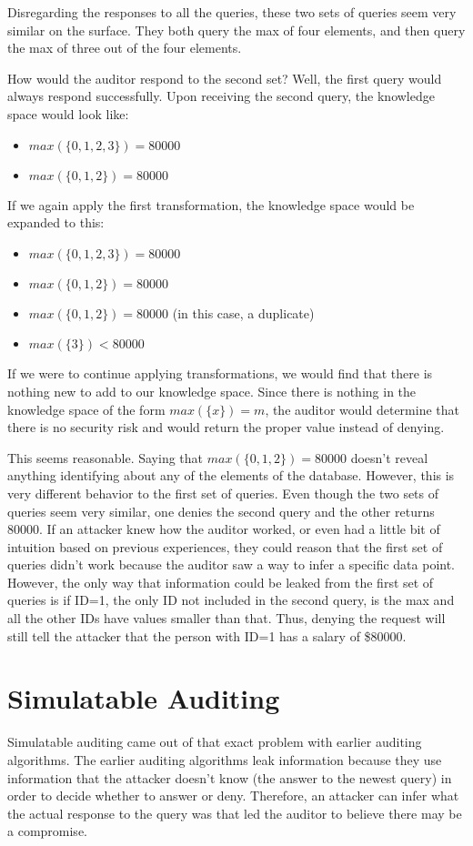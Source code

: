 \documentclass{article}
\begin{document}
Disregarding the responses to all the queries, these two sets of queries seem very similar on the surface.
They both query the max of four elements, and then query the max of three out of the four elements.

How would the auditor respond to the second set?
Well, the first query would always respond successfully.
Upon receiving the second query, the knowledge space would look like:
\begin{itemize}
    \item $max(\{0, 1, 2, 3\}) = 80000$
    \item $max(\{0, 1, 2\}) = 80000$
\end{itemize}

If we again apply the first transformation, the knowledge space would be expanded to this:
\begin{itemize}
    \item $max(\{0, 1, 2, 3\}) = 80000$
    \item $max(\{0, 1, 2\}) = 80000$
    \item $max(\{0, 1, 2\}) = 80000$ (in this case, a duplicate)
    \item $max(\{3\}) < 80000$
\end{itemize}

If we were to continue applying transformations, we would find that there is nothing new to add to our knowledge space.
Since there is nothing in the knowledge space of the form $max(\{x\}) = m$, the auditor would determine that there is no security risk and would return the proper value instead of denying.

This seems reasonable.
Saying that $max(\{0, 1, 2\}) = 80000$ doesn't reveal anything identifying about any of the elements of the database.
However, this is very different behavior to the first set of queries.
Even though the two sets of queries seem very similar, one denies the second query and the other returns 80000.
If an attacker knew how the auditor worked, or even had a little bit of intuition based on previous experiences, they could reason that the first set of queries didn't work because the auditor saw a way to infer a specific data point.
However, the only way that information could be leaked from the first set of queries is if ID=1, the only ID not included in the second query, is the max and all the other IDs have values smaller than that.
Thus, denying the request will still tell the attacker that the person with ID=1 has a salary of \$80000.

\section{Simulatable Auditing}
Simulatable auditing came out of that exact problem with earlier auditing algorithms\cite{Kenthapadi:2005}.
The earlier auditing algorithms leak information because they use information that the attacker doesn't know (the answer to the newest query) in order to decide whether to answer or deny.
Therefore, an attacker can infer what the actual response to the query was that led the auditor to believe there may be a compromise.
\end{document}
